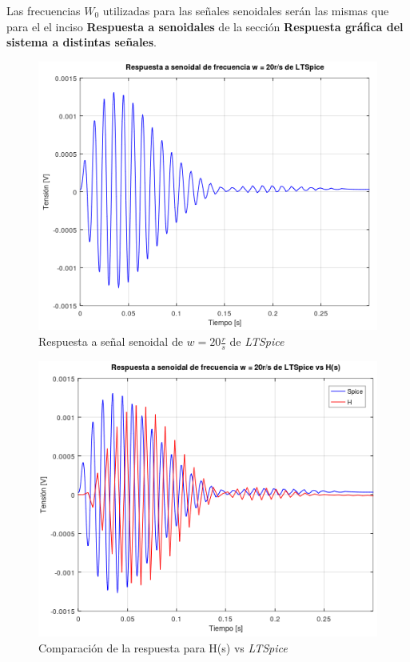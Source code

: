 \documentclass[11pt,a4paper]{report}
\begin{document}
Las frecuencias $W_{0}$ utilizadas para las señales senoidales serán las mismas que para el el inciso \textbf{Respuesta a senoidales} de la sección \textbf{Respuesta gráfica del sistema a distintas señales}.

\vspace{20 mm}

\begin{figure}[h!]
\centering
\includegraphics[scale=1]{rtaSenoidalBajoSpice.png}
\caption{Respuesta a señal senoidal de $w = 20 \frac{r}{s}$ de \textit{LTSpice}}
\end{figure}
\newpage 

\begin{figure}[h!]
\centering
\includegraphics[scale=1]{rtaSenoidalBajoSpiceComp.png}
\caption{Comparación de la respuesta para H(s) vs \textit{LTSpice}}
\end{figure}
\end{document}
